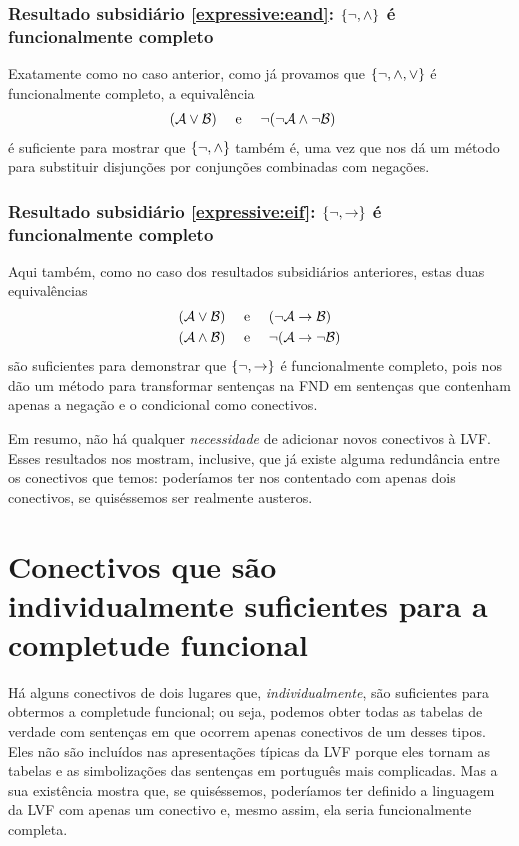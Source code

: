 \subsubsection{Resultado subsidiário \ref{expressive:eand}: $\{\neg, \wedge \}$ é funcionalmente completo}
Exatamente como no caso anterior, como já provamos que $\{ \neg, \wedge, \vee\}$ é funcionalmente completo, a equivalência 
		\begin{align*}
		(\mathcal{A} \vee \mathcal{B}) & \text{\quad \ e \quad}\neg(\neg \mathcal{A} \wedge\neg \mathcal{B})
		\end{align*}
é suficiente para mostrar que $\{ \neg, \wedge\}$ também é, uma vez que nos dá um método para substituir disjunções por conjunções combinadas com negações.

\subsubsection{Resultado subsidiário \ref{expressive:eif}: $\{\neg, \rightarrow \}$ é funcionalmente completo}
Aqui também, como no caso dos resultados subsidiários anteriores, estas duas equivalências 
		\begin{align*}
		(\mathcal{A} \vee \mathcal{B}) &\text{\quad \ e \quad} (\neg \mathcal{A} \rightarrow \mathcal{B})\\
		(\mathcal{A} \wedge \mathcal{B}) &\text{\quad \ e \quad} \neg(\mathcal{A} \rightarrow \neg\mathcal{B})
		\end{align*}
são suficientes para demonstrar que $\{ \neg, \rightarrow\}$ é funcionalmente completo, pois nos dão um método para transformar sentenças na FND em sentenças que contenham apenas a negação e o condicional como conectivos.

Em resumo, não há qualquer \emph{necessidade} de adicionar novos conectivos à LVF.
Esses resultados nos mostram, inclusive, que já existe alguma redundância entre os conectivos que temos: poderíamos ter nos contentado com apenas dois conectivos, se quiséssemos ser realmente austeros.


\section{Conectivos que são individualmente suficientes para a completude funcional}

Há alguns conectivos de dois lugares que, \emph{individualmente}, são suficientes para obtermos a completude funcional; ou seja, podemos obter todas as tabelas de verdade com sentenças em que ocorrem apenas conectivos de um desses tipos.
Eles não são incluídos nas apresentações típicas da LVF porque eles tornam as tabelas e as simbolizações das sentenças em português mais complicadas.
Mas a sua existência mostra que, se quiséssemos, poderíamos ter definido a linguagem da LVF com apenas um conectivo e, mesmo assim, ela seria funcionalmente completa.


